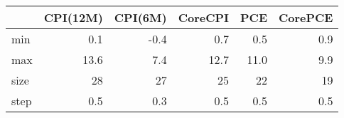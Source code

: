 \begin{tabular}{lrrrrr}
\toprule
{} &  CPI(12M) &  CPI(6M) &  CoreCPI &   PCE &  CorePCE \\
\midrule
min  &       0.1 &     -0.4 &       0.7 &   0.5 &       0.9 \\
max  &      13.6 &      7.4 &      12.7 &  11.0 &       9.9 \\
size &        28 &       27 &        25 &    22 &        19 \\
step &       0.5 &      0.3 &       0.5 &   0.5 &       0.5 \\
\bottomrule
\end{tabular}
